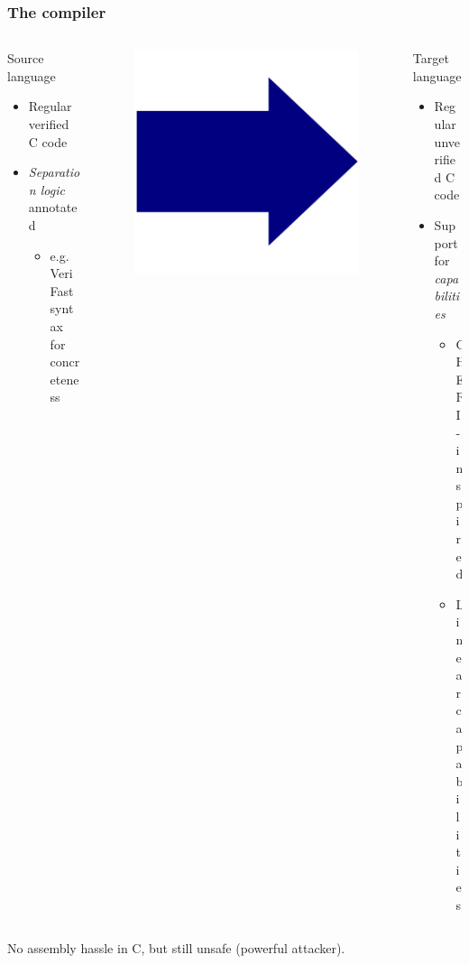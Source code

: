 \documentclass{beamer}
\begin{document}
\begin{frame}
\frametitle{The compiler}
\begin{columns}
\begin{column}{0.45\textwidth}
	\begin{block}{Source language}
	\begin{itemize}
	\item Regular verified C code
	\item \emph{Separation logic} annotated
		\begin{itemize}
		\item e.g. VeriFast syntax for concreteness
		\end{itemize}
	\end{itemize}
	\end{block}
\end{column}
\begin{column}{0.08\textwidth}
	\begin{figure}
	\includegraphics[width=0.8\linewidth]{BlueArrow}
	\end{figure}
\end{column}
\begin{column}{0.45\textwidth}
    \begin{block}{Target language}
	\begin{itemize}
	\item Regular unverified C code
	\item Support for \emph{capabilities} \\
		\begin{itemize}
		\item CHERI-inspired 
		\item Linear capabilities
		\end{itemize}
	\end{itemize}
	\end{block}
\end{column}
\end{columns}
\center No assembly hassle in C, but still unsafe (powerful attacker).


\end{frame}
\end{document}
